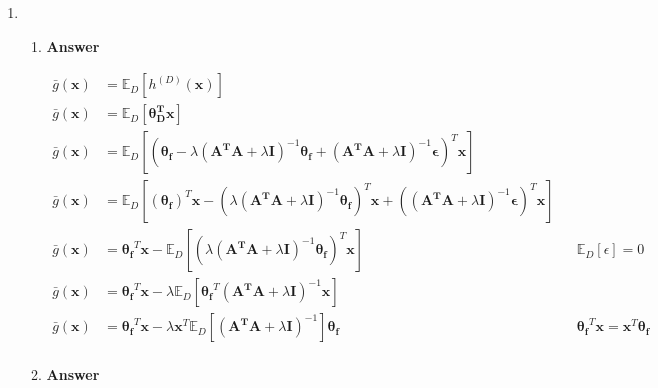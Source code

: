 \documentclass[11pt]{article}
\begin{document}
\begin{enumerate}[label=(\alph*)]

\newpage

\item

\begin{enumerate}[label=(\roman*)]

\item  \textbf{Answer}

\begin{align*}
\bar{g}(\mathbf{x}) &= \mathbb{E}_D [h^{(D)}(\mathbf{x})]\\
\bar{g}(\mathbf{x}) &= \mathbb{E}_D [\mathbf{\theta_D^T}\mathbf{x}]\\
\bar{g}(\mathbf{x}) &= \mathbb{E}_D [(\mathbf{\theta_f}- \lambda(\mathbf{A^T}\mathbf{A}+\lambda \mathbf{I})^{-1}\mathbf{\theta_f} + (\mathbf{A^T}\mathbf{A}+\lambda \mathbf{I})^{-1} \mathbf{\epsilon})^T\mathbf{x}]\\
\bar{g}(\mathbf{x}) &= \mathbb{E}_D [(\mathbf{\theta_f})^T\mathbf{x} - (\lambda(\mathbf{A^T}\mathbf{A}+\lambda \mathbf{I})^{-1}\mathbf{\theta_f})^T\mathbf{x} + ((\mathbf{A^T}\mathbf{A}+\lambda \mathbf{I})^{-1} \mathbf{\epsilon})^T\mathbf{x}]\\
\bar{g}(\mathbf{x}) &= \mathbf{\theta_f}^T\mathbf{x} - \mathbb{E}_D [(\lambda(\mathbf{A^T}\mathbf{A}+\lambda \mathbf{I})^{-1}\mathbf{\theta_f})^T\mathbf{x}] && \mathbb{E}_D[\epsilon] = 0  \\
\bar{g}(\mathbf{x}) &= \mathbf{\theta_f}^T\mathbf{x} - \lambda\mathbb{E}_D [\mathbf{\theta_f}^T(\mathbf{A^T}\mathbf{A}+\lambda \mathbf{I})^{-1}\mathbf{x}]\\
\bar{g}(\mathbf{x}) &= \mathbf{\theta_f}^T\mathbf{x} - \lambda  \mathbf{x}^T\mathbb{E}_D [(\mathbf{A^T}\mathbf{A}+\lambda \mathbf{I})^{-1}]\mathbf{\theta_f} && \mathbf{\theta_f}^T\mathbf{x} = \mathbf{x}^T\mathbf{\theta_f}  \\
\end{align*}

\item  \textbf{Answer}


\end{enumerate}
\end{enumerate}
\end{document}
